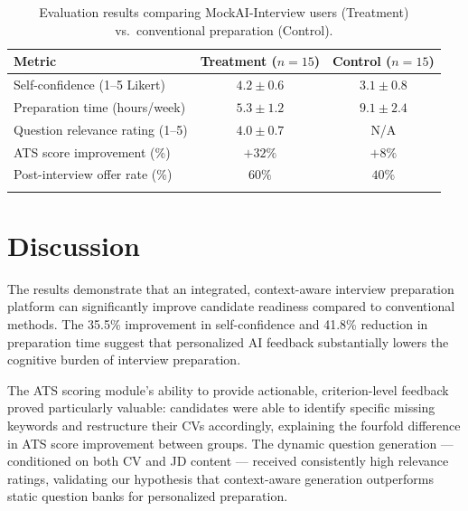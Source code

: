 \documentclass[pdflatex,sn-mathphys-num]{sn-jnl}%
\theoremstyle{thmstyleone}%
\theoremstyle{thmstyletwo}%
\theoremstyle{thmstylethree}%
\begin{document}
\begin{table}[h]
\caption{Evaluation results comparing MockAI-Interview users (Treatment) vs.\ conventional preparation (Control).}\label{tab:results}%
\begin{tabular*}{\textwidth}{@{\extracolsep\fill}lcc}
\toprule%
\textbf{Metric} & \textbf{Treatment ($n=15$)} & \textbf{Control ($n=15$)} \\
\midrule
Self-confidence (1--5 Likert)   & $4.2 \pm 0.6$    & $3.1 \pm 0.8$ \\
Preparation time (hours/week)   & $5.3 \pm 1.2$    & $9.1 \pm 2.4$ \\
Question relevance rating (1--5)& $4.0 \pm 0.7$    & N/A \\
ATS score improvement (\%)      & $+32\%$           & $+8\%$ \\
Post-interview offer rate (\%)  & $60\%$            & $40\%$ \\
\botrule
\end{tabular*}
\end{table}

\section{Discussion}\label{sec6}

The results demonstrate that an integrated, context-aware interview preparation platform can significantly improve candidate readiness compared to conventional methods. The 35.5\% improvement in self-confidence and 41.8\% reduction in preparation time suggest that personalized AI feedback substantially lowers the cognitive burden of interview preparation.

The ATS scoring module's ability to provide actionable, criterion-level feedback proved particularly valuable: candidates were able to identify specific missing keywords and restructure their CVs accordingly, explaining the fourfold difference in ATS score improvement between groups. The dynamic question generation — conditioned on both CV and JD content — received consistently high relevance ratings, validating our hypothesis that context-aware generation outperforms static question banks for personalized preparation.
\end{document}

